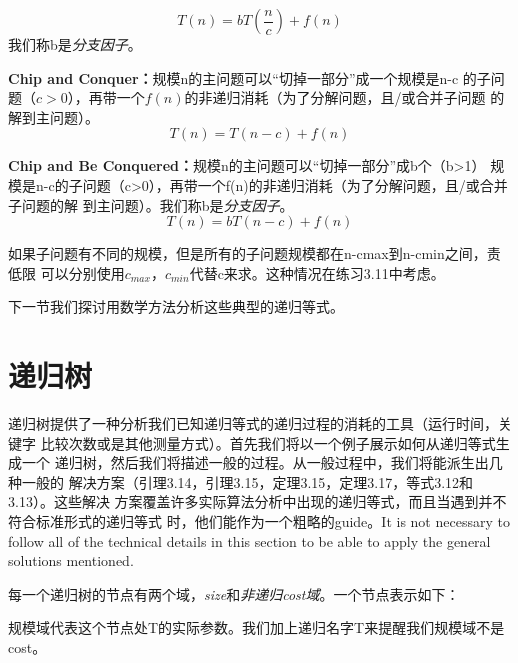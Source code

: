 \begin{equation}\label{Equ:3_3}
T(n)=bT(\frac{n}{c})+f(n)
\end{equation}
我们称b是\emph{分支因子}。

{\textbf{Chip and Conquer：}}规模n的主问题可以“切掉一部分”成一个规模是n-c
的子问题（$c>0$），再带一个$f(n)$的非递归消耗（为了分解问题，且/或合并子问题
的解到主问题）。
\begin{equation}\label{Equ:3_4}
T(n)=T(n-c)+f(n)
\end{equation}

{\textbf{Chip and Be Conquered：}}规模n的主问题可以“切掉一部分”成b个（b>1）
规模是n-c的子问题（c>0），再带一个f(n)的非递归消耗（为了分解问题，且/或合并子问题的解
到主问题）。我们称b是\emph{分支因子}。
\begin{equation}\label{Equ:3_5}
T(n)=bT(n-c)+f(n)
\end{equation}

如果子问题有不同的规模，但是所有的子问题规模都在n-cmax到n-cmin之间，责低限
可以分别使用$c_{max}$，$c_{min}$代替c来求。这种情况在练习3.11中考虑。

下一节我们探讨用数学方法分析这些典型的递归等式。

\section{递归树}\label{Sec:RecursionTrees}
递归树提供了一种分析我们已知递归等式的递归过程的消耗的工具（运行时间，关键字
比较次数或是其他测量方式）。首先我们将以一个例子展示如何从递归等式生成一个
递归树，然后我们将描述一般的过程。从一般过程中，我们将能派生出几种一般的
解决方案（引理3.14，引理3.15，定理3.15，定理3.17，等式3.12和3.13）。这些解决
方案覆盖许多实际算法分析中出现的递归等式，而且当遇到并不符合标准形式的递归等式
时，他们能作为一个粗略的guide。It is not necessary to follow all of the
technical details in this section to be able to apply the general solutions
mentioned.

每一个递归树的节点有两个域，\emph{size}和\emph{非递归cost域}。一个节点表示如下：

\begin{center}
\end{center}

规模域代表这个节点处T的实际参数。我们加上递归名字T来提醒我们规模域不是cost。



